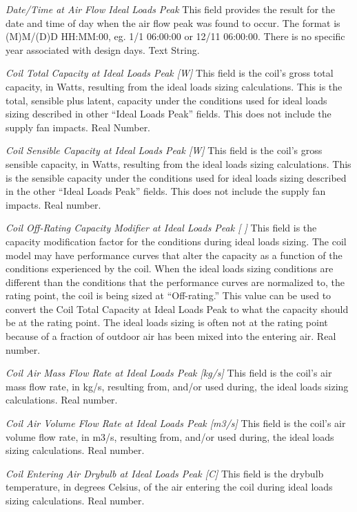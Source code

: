 \emph{Date/Time at Air Flow Ideal Loads Peak}  This field provides the result for the date and time of day when the air flow peak was found to occur.  The format is (M)M/(D)D HH:MM:00, eg. 1/1 06:00:00 or 12/11 06:00:00.  There is no specific year associated with design days. Text String.

\emph{Coil Total Capacity at Ideal Loads Peak [W]}  This field is the coil's gross total capacity, in Watts, resulting from the ideal loads sizing calculations.  This is the total, sensible plus latent, capacity under the conditions used for ideal loads sizing described in other ``Ideal Loads Peak'' fields.  This does not include the supply fan impacts.  Real Number.

\emph{Coil Sensible Capacity at Ideal Loads Peak [W]}  This field is the coil's gross sensible capacity, in Watts, resulting from the ideal loads sizing calculations.  This is the sensible capacity under the conditions used for ideal loads sizing described in the other ``Ideal Loads Peak'' fields.  This does not include the supply fan impacts.  Real number.

\emph{Coil Off-Rating Capacity Modifier at Ideal Loads Peak [ ]}  This field is the capacity modification factor for the conditions during ideal loads sizing.  The coil model may have performance curves that alter the capacity as a function of the conditions experienced by the coil. When the ideal loads sizing conditions are different than the conditions that the performance curves are normalized to, the rating point, the coil is being sized at ``Off-rating.''  This value can be used to convert the Coil Total Capacity at Ideal Loads Peak to what the capacity should be at the rating point.  The ideal loads sizing is often not at the rating point because of a fraction of outdoor air has been mixed into the entering air. Real number.

\emph{Coil Air Mass Flow Rate at Ideal Loads Peak [kg/s]}  This field is the coil's air mass flow rate, in kg/s, resulting from, and/or used during, the ideal loads sizing calculations.  Real number.

\emph{Coil Air Volume Flow Rate at Ideal Loads Peak [m3/s]}  This field is the coil's air volume flow rate, in m3/s, resulting from, and/or used during, the ideal loads sizing calculations.  Real number.

\emph{Coil Entering Air Drybulb at Ideal Loads Peak [C]}  This field is the drybulb temperature, in degrees Celsius, of the air entering the coil during ideal loads sizing calculations.  Real number.

